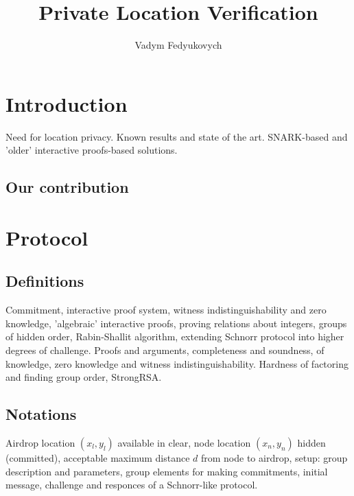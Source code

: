 \documentclass{llncs}
\begin{document}
\title{Private Location Verification}
\author{Vadym Fedyukovych}
\maketitle


\section{Introduction}

Need for location privacy.
Known results and state of the art.
SNARK-based and 'older' interactive proofs-based solutions.

\subsection{Our contribution}

\section{Protocol}
\subsection{Definitions}

Commitment, interactive proof system, witness indistinguishability and zero knowledge,
'algebraic' interactive proofs,
proving relations about integers,
groups of hidden order,
Rabin-Shallit algorithm,
extending Schnorr protocol into higher degrees of challenge.
Proofs and arguments, completeness and soundness, of knowledge, zero knowledge and witness indistinguishability.
Hardness of factoring and finding group order, StrongRSA.

\subsection{Notations}

Airdrop location $(x_l, y_l)$ available in clear, node location $(x_n, y_n)$ hidden (committed),
acceptable maximum distance $d$ from node to airdrop,
setup: group description and parameters, group elements for making commitments,
initial message, challenge and responces of a Schnorr-like protocol.
\end{document}
